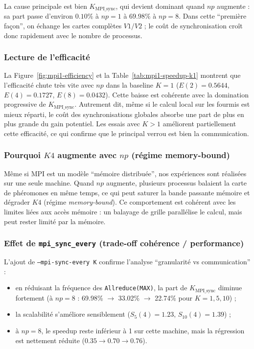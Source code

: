 La cause principale est bien \(K_{\text{MPI\_sync}}\), qui devient dominant quand \(np\) augmente :
sa part passe d'environ \(0.10\%\) à \(np=1\) à \(69.98\%\) à \(np=8\).
Dans cette ``première façon'', on échange les cartes complètes \(V1/V2\) ; le coût de synchronisation
croît donc rapidement avec le nombre de processus.

\subsubsection{Lecture de l'efficacité}

La Figure~\ref{fig:mpi1-efficiency} et la Table~\ref{tab:mpi1-speedup-k1} montrent que l'efficacité
chute très vite avec \(np\) dans la baseline \(K=1\) (\(E(2)=0.5644\), \(E(4)=0.1727\), \(E(8)=0.0432\)).
Cette baisse est cohérente avec la domination progressive de \(K_{\text{MPI\_sync}}\).
Autrement dit, même si le calcul local sur les fourmis est mieux réparti, le coût des synchronisations
globales absorbe une part de plus en plus grande du gain potentiel. Les essais avec \(K>1\) améliorent
partiellement cette efficacité, ce qui confirme que le principal verrou est bien la communication.

\subsubsection{Pourquoi \(K4\) augmente avec \(np\) (régime memory-bound)}

Même si MPI est un modèle ``mémoire distribuée'', nos expériences sont réalisées sur une seule machine.
Quand \(np\) augmente, plusieurs processus balaient la carte de phéromones en même temps, ce qui
peut saturer la bande passante mémoire et dégrader \(K4\) (régime \emph{memory-bound}).
Ce comportement est cohérent avec les limites liées aux accès mémoire : un balayage de grille
parallélise le calcul, mais peut rester limité par la mémoire.

\subsubsection{Effet de \texttt{mpi\_sync\_every} (trade-off cohérence / performance)}

L'ajout de \texttt{--mpi-sync-every K} confirme l'analyse ``granularité vs communication'' :
\begin{itemize}[leftmargin=*]
  \item en réduisant la fréquence des \texttt{Allreduce(MAX)}, la part de \(K_{\text{MPI\_sync}}\)
  diminue fortement (à \(np=8\) : 69.98\% \(\rightarrow\) 33.02\% \(\rightarrow\) 22.74\% pour
  \(K=1,5,10\)) ;
  \item la scalabilité s'améliore sensiblement (\(S_5(4)=1.23\), \(S_{10}(4)=1.39\)) ;
  \item à \(np=8\), le speedup reste inférieur à 1 sur cette machine, mais la régression est nettement
  réduite (\(0.35 \rightarrow 0.70 \rightarrow 0.76\)).
\end{itemize}

